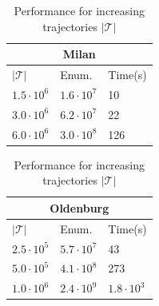 \documentclass[preprint,12pt,authoryear]{elsarticle} %
\renewcommand{\sf}[1]{\textsf{\textup{#1}}}
\begin{document}
\begin{table}[t]
\scriptsize\centering
\centering
\caption{Performance for increasing trajectories $|\mathcal{T}|$}
\label{tab:efftraj}%
\begin{tabular}{p{0.9cm}p{0.9cm}p{1.0cm}}
\multicolumn{3}{c}{\sf{Milan}}\\
\toprule
  $|\mathcal{T}|$ &        Enum. & Time(s) \\
\midrule
 $1.5\cdot10^{6}$ &  $1.6\cdot10^{7}$ &       10 \\
 $3.0\cdot10^{6}$ &  $6.2\cdot10^{7}$ &       22 \\
 $6.0\cdot10^{6}$ &  $3.0\cdot10^{8}$ &      126 \\
\bottomrule
\end{tabular}
\begin{tabular}{p{0.9cm}p{0.9cm}p{1.0cm}}
\multicolumn{3}{c}{\sf{Oldenburg}}\\
\toprule
  $|\mathcal{T}|$ &        Enum. &          Time(s) \\
\midrule
 $2.5\cdot10^{5}$ &  $5.7\cdot10^{7}$ &                43 \\
 $5.0\cdot10^{5}$ &  $4.1\cdot10^{8}$ &               273 \\
 $1.0\cdot10^{6}$ &  $2.4\cdot10^{9}$ &  $1.8\cdot10^{3}$ \\
\bottomrule
\end{tabular}
\end{table}%
\end{document}
